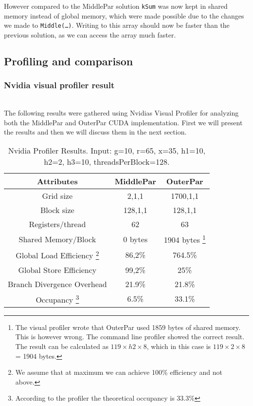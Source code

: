 However compared to the MiddlePar solution \texttt{kSum} was now kept in shared memory instead of global memory, which were made possible due to the changes we made to \texttt{Middle(…)}. Writing to this array should now be faster than the previous solution, as we can access the array much faster.

\subsection{Profiling and comparison}
\subsubsection{Nvidia visual profiler result} \hfill \\

The following results were gathered using Nvidias Visual Profiler for analyzing both the MiddlePar and OuterPar CUDA implementation. First we will present the results and then we will discuss them in the next section.
\begin{savenotes}
\begin{table}  
\begin{center}
\begin{tabular}[t]{|c|c|c|}
	\hline
\textbf{Attributes} & \textbf{MiddlePar} & \textbf{OuterPar} \\\hline
Grid size  & 2,1,1 & 1700,1,1\\\hline
Block size & 128,1,1&128,1,1\\\hline
Registers/thread & 62&63\\\hline
Shared Memory/Block &0 bytes& 1904 bytes \footnote{The visual profiler wrote that OuterPar used 1859 bytes of shared memory. This is however wrong. The command line profiler showed the correct result. The result can be calculated as $119 \times h2 \times 8$, which in this case is $119 \times 2 \times8$ = 1904 bytes.}\\\hline
Global Load Efficiency \footnote{We assume that at maximum we can achieve 100\% efficiency and not above.}&86,2\%&764.5\%\\\hline
Global Store Efficiency&99,2\%&25\%\\\hline
Branch Divergence Overhead&21.9\%& 21.8\%\\\hline
Occupancy \footnote{According to the profiler the theoretical occupancy is 33.3\%}&6.5\%&33.1\%\\\hline
\end{tabular}
\end{center}
\caption{Nvidia Profiler Results. Input: g=10, r=65, x=35, h1=10, h2=2, h3=10, threadsPerBlock=128.}
\label{table:profiler}
\end{table}
\end{savenotes}


